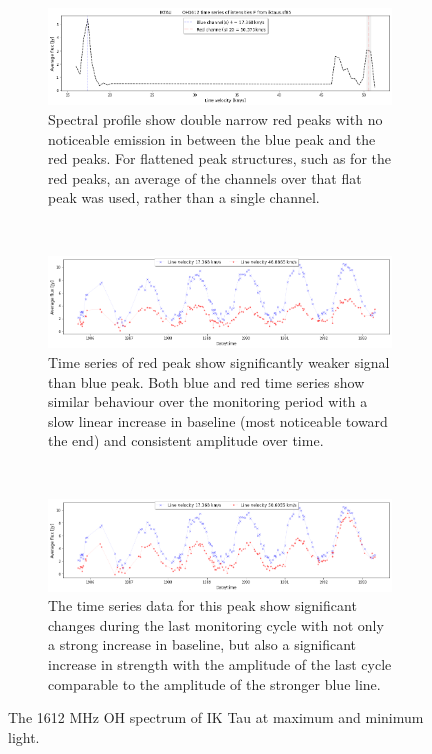 \begin{figure}
\centering
  \begin{subfigure}{\hsize}
    \includegraphics[width=0.95\hsize]{images/IKTau_avg_spectrum.png}
    \caption{\label{fig:iktauspectrum}Spectral profile show double narrow red peaks with no noticeable emission in between the blue peak and the red peaks. For flattened peak structures, such as for the red peaks, an average of the channels over that flat peak was used, rather than a single channel.}
  \end{subfigure}%
  \\
  \begin{subfigure}{\hsize}
    \includegraphics[width=0.95\hsize]{images/IKTau_ts_blue4_red12.png}
    \caption{\label{fig:iktautimeseries0}Time series of red peak show significantly weaker signal than blue peak. Both blue and red time series show similar behaviour over the monitoring period with a slow linear increase in baseline (most noticeable toward the end) and consistent amplitude over time.}
  \end{subfigure}%
  \\
  \begin{subfigure}{\hsize}
    \includegraphics[width=0.95\hsize]{images/IKTau_ts_blue4_red20.png}
    \caption{\label{fig:iktautimeseries1}The time series data for this peak show significant changes during the last monitoring cycle with not only a strong increase in baseline, but also a significant increase in strength with the amplitude of the last cycle comparable to the amplitude of the stronger blue line.}
  \end{subfigure}%
\caption{\label{fig:iktau}The 1612 MHz OH spectrum of IK Tau at maximum and minimum light.}
\end{figure}

